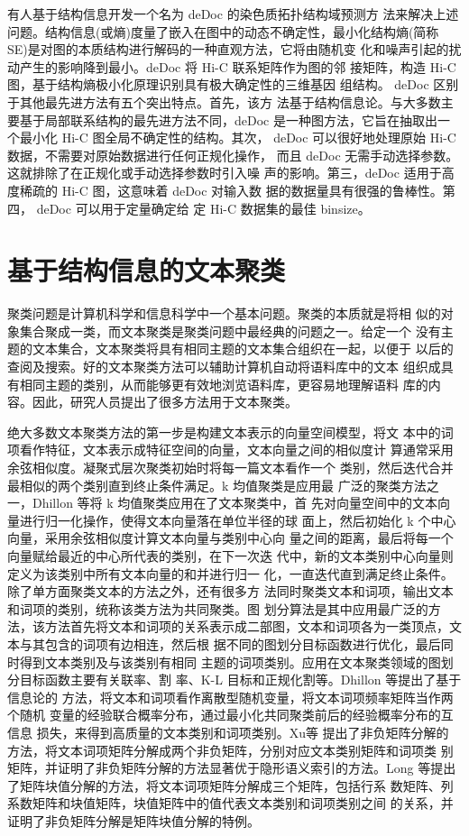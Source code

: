 \documentclass[a4paper]{apa6}
\begin{document}
有人基于结构信息开发一个名为 deDoc 的染色质拓扑结构域预测方 法来解决上述问题。结构信息(或熵)度量了嵌入在图中的动态不确定性，最小化结构熵(简称 SE)是对图的本质结构进行解码的一种直观方法，它将由随机变 化和噪声引起的扰动产生的影响降到最小。deDoc 将 Hi-C 联系矩阵作为图的邻 接矩阵，构造 Hi-C 图，基于结构熵极小化原理识别具有极大确定性的三维基因 组结构。 deDoc 区别于其他最先进方法有五个突出特点。首先，该方 法基于结构信息论。与大多数主要基于局部联系结构的最先进方法不同，deDoc 是一种图方法，它旨在抽取出一个最小化 Hi-C 图全局不确定性的结构。其次， deDoc 可以很好地处理原始 Hi-C 数据，不需要对原始数据进行任何正规化操作， 而且 deDoc 无需手动选择参数。这就排除了在正规化或手动选择参数时引入噪 声的影响。第三，deDoc 适用于高度稀疏的 Hi-C 图，这意味着 deDoc 对输入数 据的数据量具有很强的鲁棒性。第四， deDoc 可以用于定量确定给 定 Hi-C 数据集的最佳 binsize。

\section{基于结构信息的文本聚类}
\label{sec:org8420d84}
聚类问题是计算机科学和信息科学中一个基本问题。聚类的本质就是将相 似的对象集合聚成一类，而文本聚类是聚类问题中最经典的问题之一。给定一个 没有主题的文本集合，文本聚类将具有相同主题的文本集合组织在一起，以便于 以后的查阅及搜索。好的文本聚类方法可以辅助计算机自动将语料库中的文本 组织成具有相同主题的类别，从而能够更有效地浏览语料库，更容易地理解语料 库的内容。因此，研究人员提出了很多方法用于文本聚类。

绝大多数文本聚类方法的第一步是构建文本表示的向量空间模型，将文 本中的词项看作特征，文本表示成特征空间的向量，文本向量之间的相似度计 算通常采用余弦相似度。凝聚式层次聚类初始时将每一篇文本看作一个 类别，然后迭代合并最相似的两个类别直到终止条件满足。k 均值聚类是应用最 广泛的聚类方法之一，Dhillon 等\citep{dhillon2001efficient}将 k 均值聚类应用在了文本聚类中，首 先对向量空间中的文本向量进行归一化操作，使得文本向量落在单位半径的球 面上，然后初始化 k 个中心向量，采用余弦相似度计算文本向量与类别中心向 量之间的距离，最后将每一个向量赋给最近的中心所代表的类别，在下一次迭 代中，新的文本类别中心向量则定义为该类别中所有文本向量的和并进行归一 化，一直迭代直到满足终止条件。除了单方面聚类文本的方法之外，还有很多方 法同时聚类文本和词项，输出文本和词项的类别，统称该类方法为共同聚类。图 划分算法是其中应用最广泛的方法，该方法首先将文本和词项的关系表示成二部图，文本和词项各为一类顶点，文本与其包含的词项有边相连，然后根 据不同的图划分目标函数进行优化，最后同时得到文本类别及与该类别有相同 主题的词项类别。应用在文本聚类领域的图划分目标函数主要有关联率、割 率、K-L 目标和正规化割等。Dhillon 等\citep{dhillon2003information}提出了基于信息论的 方法，将文本和词项看作离散型随机变量，将文本词项频率矩阵当作两个随机 变量的经验联合概率分布，通过最小化共同聚类前后的经验概率分布的互信息 损失，来得到高质量的文本类别和词项类别。Xu\citep{xu2003document}等 提出了非负矩阵分解的 方法，将文本词项矩阵分解成两个非负矩阵，分别对应文本类别矩阵和词项类 别矩阵，并证明了非负矩阵分解的方法显著优于隐形语义索引的方法。Long 等\citep{long2005co}提出了矩阵块值分解的方法，将文本词项矩阵分解成三个矩阵，包括行系 数矩阵、列系数矩阵和块值矩阵，块值矩阵中的值代表文本类别和词项类别之间 的关系，并证明了非负矩阵分解是矩阵块值分解的特例。
\end{document}

